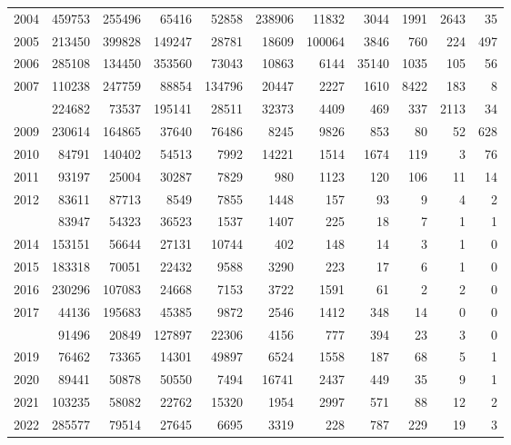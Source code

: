 \documentclass[
]{article}
\begin{document}
\begin{longtable}[t]{lrrrrrrrrrr}
2004 & 459753 & 255496 & 65416 & 52858 & 238906 & 11832 & 3044 & 1991 & 2643 & 35\\
2005 & 213450 & 399828 & 149247 & 28781 & 18609 & 100064 & 3846 & 760 & 224 & 497\\
2006 & 285108 & 134450 & 353560 & 73043 & 10863 & 6144 & 35140 & 1035 & 105 & 56\\
2007 & 110238 & 247759 & 88854 & 134796 & 20447 & 2227 & 1610 & 8422 & 183 & 8\\
\addlinespace
2008 & 224682 & 73537 & 195141 & 28511 & 32373 & 4409 & 469 & 337 & 2113 & 34\\
2009 & 230614 & 164865 & 37640 & 76486 & 8245 & 9826 & 853 & 80 & 52 & 628\\
2010 & 84791 & 140402 & 54513 & 7992 & 14221 & 1514 & 1674 & 119 & 3 & 76\\
2011 & 93197 & 25004 & 30287 & 7829 & 980 & 1123 & 120 & 106 & 11 & 14\\
2012 & 83611 & 87713 & 8549 & 7855 & 1448 & 157 & 93 & 9 & 4 & 2\\
\addlinespace
2013 & 83947 & 54323 & 36523 & 1537 & 1407 & 225 & 18 & 7 & 1 & 1\\
2014 & 153151 & 56644 & 27131 & 10744 & 402 & 148 & 14 & 3 & 1 & 0\\
2015 & 183318 & 70051 & 22432 & 9588 & 3290 & 223 & 17 & 6 & 1 & 0\\
2016 & 230296 & 107083 & 24668 & 7153 & 3722 & 1591 & 61 & 2 & 2 & 0\\
2017 & 44136 & 195683 & 45385 & 9872 & 2546 & 1412 & 348 & 14 & 0 & 0\\
\addlinespace
2018 & 91496 & 20849 & 127897 & 22306 & 4156 & 777 & 394 & 23 & 3 & 0\\
2019 & 76462 & 73365 & 14301 & 49897 & 6524 & 1558 & 187 & 68 & 5 & 1\\
2020 & 89441 & 50878 & 50550 & 7494 & 16741 & 2437 & 449 & 35 & 9 & 1\\
2021 & 103235 & 58082 & 22762 & 15320 & 1954 & 2997 & 571 & 88 & 12 & 2\\
2022 & 285577 & 79514 & 27645 & 6695 & 3319 & 228 & 787 & 229 & 19 & 3\\*
\end{longtable}
\end{document}
